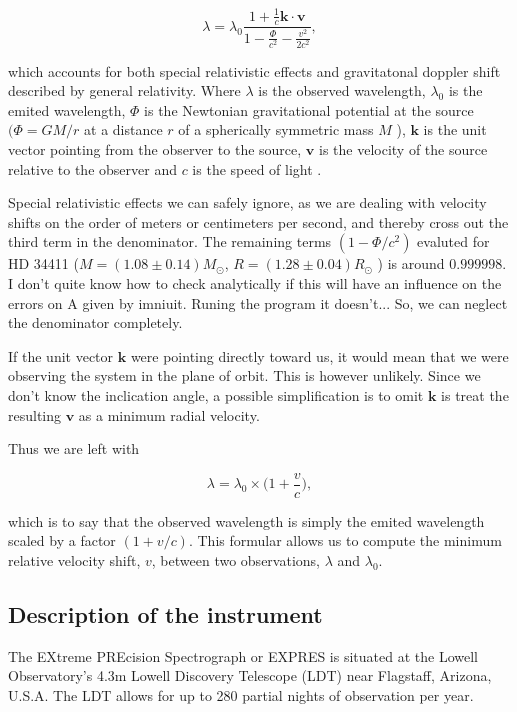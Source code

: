 \begin{equation}
    \label{eq:doppler_GR_SR}
    \lambda=\lambda_{0} \frac{1+\frac{1}{c} \mathbf{k} \cdot \mathbf{v}}{1-\frac{\Phi}{c^{2}}-\frac{v^{2}}{2 c^{2}}},
\end{equation}

which accounts for both special relativistic effects and gravitatonal doppler shift described by general relativity. Where $\lambda$ is the observed wavelength, $\lambda_0$ is the emited wavelength, $\Phi$ is the Newtonian gravitational potential at the source $(\Phi=G M / r$ at a distance $r$ of a spherically symmetric mass $M$ ), $\textbf{k}$ is the unit vector pointing from the observer to the source, $\textbf{v}$ is the velocity of the source relative to the observer and $c$ is the speed of light \cite{doppler_shift_GR_formular}.

Special relativistic effects we can safely ignore, as we are dealing with velocity shifts on the order of meters or centimeters per second, and thereby cross out the third term in the denominator. The remaining terms $(1-\Phi/c^2)$ evaluted for HD 34411 ($M = (1.08 \pm 0.14) M_{\odot}$, $R = (1.28 \pm 0.04) R_{\odot}$ \cite{star_properties}) is around $0.999998$. \todo{}I don't quite know how to check analytically if this will have an influence on the errors on A given by imniuit. Runing the program it doesn't... So, we can neglect the denominator completely.

If the unit vector $\textbf{k}$ were pointing directly toward us, it would mean that we were observing the system in the plane of orbit. This is however unlikely. Since we don't know the inclication angle, a possible simplification is to omit $\textbf{k}$ is treat the resulting $\textbf{v}$ as a minimum radial velocity.

Thus we are left with 

\begin{equation}
    \label{eq:our_doppler}
    \lambda = \lambda_0 \times \Big(1 + \frac{v}{c} \Big),
\end{equation}

which is to say that the observed wavelength is simply the emited wavelength scaled by a factor $(1 + v/c)$. This formular allows us to compute the minimum relative velocity shift, $v$, between two observations, $\lambda$ and $\lambda_0$.


\subsection{Description of the instrument}
The EXtreme PREcision Spectrograph or EXPRES is situated at the Lowell Observatory's 4.3m Lowell Discovery Telescope (LDT) near Flagstaff, Arizona, U.S.A. The LDT allows for up to 280 partial nights of observation per year. 

